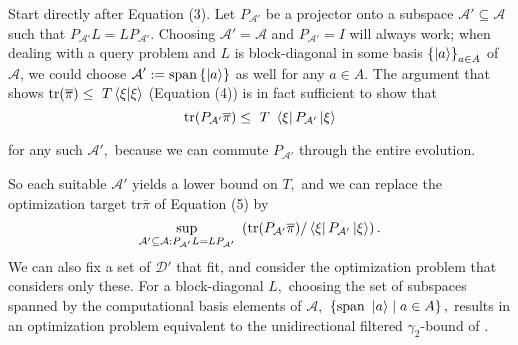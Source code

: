 \documentclass{article}
\begin{document}
Start directly after Equation (3). Let $\displaystyle P_{\mathcal{A} '}$ be a projector onto a subspace $\displaystyle \mathcal{A} '\subseteq \mathcal{A}$ such that $\displaystyle P_{\mathcal{A} '} L=LP_{\mathcal{A} '} .$ Choosing $\displaystyle \mathcal{A'=A}$ and $\displaystyle P_{\mathcal{A} '} =I$ will always work; when dealing with a query problem and $\displaystyle L$ is block-diagonal in some basis $\displaystyle \left\{\ket{a}\right\}_{a\in A}$ of $\displaystyle \mathcal{A}$, we could choose $\displaystyle \mathcal{A} ':=\mathrm{span} \left\{ \ket{a} \right\}$ as well for any $\displaystyle a\in A.$ The argument that shows $\displaystyle \mathrm{tr}(\overline{\pi }) \leq \ T\bra{\xi }\ket{\xi }$ (Equation (4)) is in fact sufficient to show that \begin{equation}
\mathrm{tr}( P_{\mathcal{A} '}\overline{\pi }) \leq \ T\ \bra{\xi } P_{\mathcal{A} '}\ket{\xi }
\end{equation}

for any such $\displaystyle \mathcal{A} ',$ because we can commute $\displaystyle P_{\mathcal{A} '}$ through the entire evolution.



So each suitable $\displaystyle \mathcal{A} '$ yields a lower bound on $\displaystyle T,$ and we can replace the optimization target $\displaystyle \mathrm{tr}\overline{\pi }$ of Equation (5) by
\begin{equation*}
\underset{\mathcal{A} '\subseteq \mathcal{A} :P_{\mathcal{A} '} L=LP_{\mathcal{A} '}}{\mathrm{sup}} \ \left(\mathrm{tr}( P_{\mathcal{A} '}\overline{\pi }) /\bra{\xi } P_{\mathcal{A} '}\ket{\xi }\right) .
\end{equation*}
We can also fix a set of $\displaystyle \mathcal{D'}$ that fit, and consider the optimization problem that considers only these. For a block-diagonal $\displaystyle L,$ choosing the set of subspaces spanned by the computational basis elements of $\displaystyle \mathcal{A} ,$ $\displaystyle \left\{\mathrm{span} \ \ket{a} \mid a\in A\right\} ,$ results in an optimization problem equivalent to the unidirectional filtered $\displaystyle \gamma _{2}$-bound of \cite{LasVegas}.
\end{document}
